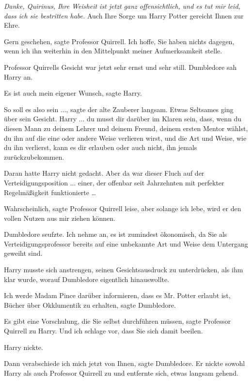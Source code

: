 \glqq{}\emph{Danke, Quirinus, Ihre Weisheit ist jetzt ganz offensichtlich, und es
tut mir leid, dass ich sie bestritten habe.} Auch Ihre Sorge um Harry Potter
gereicht Ihnen zur Ehre.\grqq{}

\glqq{}Gern geschehen\grqq{}, sagte Professor Quirrell. \glqq{}Ich hoffe, Sie
haben nichts dagegen, wenn ich ihn weiterhin in den Mittelpunkt meiner
Aufmerksamkeit stelle.\grqq{}

Professor Quirrells Gesicht war jetzt sehr ernst und sehr still. Dumbledore sah
Harry an.

\glqq{}Es ist auch mein eigener Wunsch\grqq{}, sagte Harry.

\glqq{}So soll es also sein ...\grqq{}, sagte der alte Zauberer langsam. Etwas
Seltsames ging über sein Gesicht. \glqq{}Harry ... du musst dir darüber im Klaren
sein, dass, wenn du diesen Mann zu deinem Lehrer und deinem Freund, deinem
ersten Mentor wählst, du ihn auf die eine oder andere Weise verlieren wirst, und
die Art und Weise, wie du ihn verlierst, kann es dir erlauben oder auch nicht,
ihn jemals zurückzubekommen.\grqq{}

Daran hatte Harry nicht gedacht. Aber da war dieser Fluch auf der
Verteidigungsposition ... einer, der offenbar seit Jahrzehnten mit perfekter
Regelmäßigkeit funktionierte …

\glqq{}Wahrscheinlich\grqq{}, sagte Professor Quirrell leise, \glqq{}aber solange
ich lebe, wird er den vollen Nutzen aus mir ziehen können.\grqq{}

Dumbledore seufzte. \glqq{}Ich nehme an, es ist zumindest ökonomisch, da Sie als
Verteidigungsprofessor bereits auf eine unbekannte Art und Weise dem Untergang
geweiht sind.\grqq{}

Harry musste sich anstrengen, seinen Gesichtsausdruck zu unterdrücken, als ihm
klar wurde, worauf Dumbledore eigentlich hinauswollte.

\glqq{}Ich werde Madam Pince darüber informieren, dass es Mr. Potter erlaubt ist,
Bücher über Okklumentik zu erhalten\grqq{}, sagte Dumbledore.

\glqq{}Es gibt eine Vorschulung, die Sie selbst durchführen müssen\grqq{}, sagte
Professor Quirrell zu Harry. \glqq{}Und ich schlage vor, dass Sie sich damit
beeilen.\grqq{}

Harry nickte.

\glqq{}Dann verabschiede ich mich jetzt von Ihnen\grqq{}, sagte Dumbledore. Er
nickte sowohl Harry als auch Professor Quirrell zu und entfernte sich, etwas
langsam gehend.

